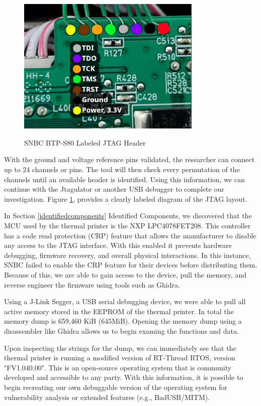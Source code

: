\begin{figure}[ht]
    \centering
    {\includegraphics[width=88mm,scale=0.5]
    {Figures/Teardown/JTAG_annotated.png}}
    \caption{SNBC BTP-S80 Labeled JTAG Header}
    \label{fig:snbc_btp_s80_jtag_header}
\end{figure}

With the ground and voltage reference pins validated, the researcher can connect up to 24 channels or pins. The tool will then check every permutation of the channels until an available header is identified. Using this information, we can continue with the Jtagulator or another USB debugger to complete our investigation. Figure \ref{fig:snbc_btp_s80_jtag_header}, provides a clearly labeled diagram of the JTAG layout.

In Section \ref{identifiedcomponents} Identified Components, we discovered that the MCU used by the thermal printer is the NXP LPC4078FET208. This controller has a code read protection (CRP) feature that allows the manufacturer to disable any access to the JTAG interface. With this enabled it prevents hardware debugging, firmware recovery, and overall physical interactions. In this instance, SNBC failed to enable the CRP feature for their devices before distributing them. Because of this, we are able to gain access to the device, pull the memory, and reverse engineer the firmware using tools such as Ghidra.

Using a J-Link Segger, a USB serial debugging device, we were able to pull all active memory stored in the EEPROM of the thermal printer. In total the memory dump is 659,460 KiB (645MiB). Opening the memory dump using a disassembler like Ghidra allows us to begin examing the functions and data.

Upon inspecting the strings for the dump, we can immediately see that the thermal printer is running a modified version of RT-Thread RTOS, version "FV1.040.00". This is an open-source operating system that is community developed and accessible to any party. With this information, it is possible to begin recreating our own debuggable version of the operating system for vulnerability analysis or extended features (e.g., BadUSB/MITM).

